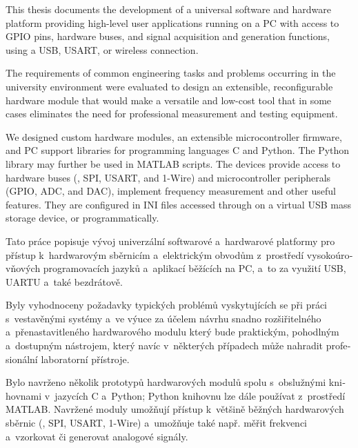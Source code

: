 
\begin{abstract-english}
This thesis documents the development of a universal software and hardware platform providing high-level user applications running on a PC with access to GPIO pins, hardware buses, and signal acquisition and generation functions, using a USB, USART, or wireless connection.

The requirements of common engineering tasks and problems occurring in the university environment were evaluated to design an extensible, reconfigurable hardware module that would make a versatile and low-cost tool that in some cases eliminates the need for professional measurement and testing equipment.

We designed custom hardware modules, an extensible microcontroller firmware, and PC support libraries for programming languages C and Python. The Python library may further  be used in MATLAB scripts. The devices provide access to hardware buses (\IIC, SPI, USART, and 1-Wire) and microcontroller peripherals (GPIO, ADC, and DAC), implement frequency measurement and other useful features. They are configured in INI files accessed through on a virtual USB mass storage device, or programmatically.
\end{abstract-english}

\begin{abstract-czech}
\begin{otherlanguage}{czech}
Tato práce popisuje vývoj univerzální softwarové a~hardwarové platformy pro přístup k~hardwarovým sběrnicím a~elektrickým obvodům z~prostředí vysokoúrovňových programovacích jazyků a~aplikací běžících na PC, a~to za využití USB, UARTU a~také bezdrátově.

Byly vyhodnoceny požadavky typických problémů vyskytujících se při práci s~vestavěnými systémy a~ve výuce za účelem návrhu snadno rozšiřitelného a~přenastavitleného hardwarového modulu který bude praktickým, pohodlným a~dostupným nástrojem, který navíc v~některých případech může nahradit profesionální laboratorní přístroje.

Bylo navrženo několik prototypů hardwarových modulů spolu s~obslužnými knihovnami v~jazycích C a~Python; Python knihovnu lze dále používat z~prostředí MATLAB. Navržené moduly umožňují přístup k~většině běžných hardwarových sběrnic (\IIC, SPI, USART, 1-Wire) a~umožňuje také např. měřit frekvenci a~vzorkovat či generovat analogové signály.
\end{otherlanguage}
\end{abstract-czech}

